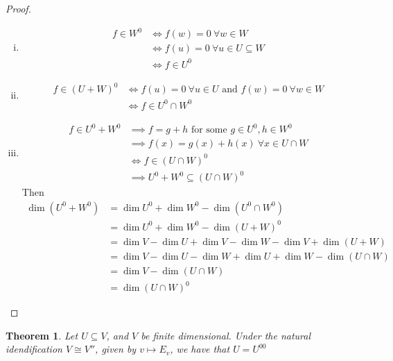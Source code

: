 \documentclass[10pt,fleqn]{article}
\theoremstyle{definition} \newtheorem{defn}{Definition}[section]
\theoremstyle{plain}      \newtheorem{thm}[defn]{Theorem}
\theoremstyle{plain}      \newtheorem{prop}[defn]{Proposition}
\theoremstyle{plain}      \newtheorem{lem}[defn]{Lemma}
\theoremstyle{plain}      \newtheorem{cor}[defn]{Corollary}
\theoremstyle{plain}      \newtheorem{ad}[defn]{Addendum}
\theoremstyle{definition} \newtheorem{ex}[defn]{Example}
\theoremstyle{definition} \newtheorem{rem}[defn]{Remark}
\numberwithin{equation}{subsection}
\begin{document}
\begin{proof}
    \begin{enumerate}[(i)]
        \item
        \begin{align*}
            f\in W^0
            &\iff
            f(w)=0~\forall w\in W\\
            &\iff
            f(u)=0~\forall u\in U\subseteq W\\
            &\iff
            f\in U^0
        \end{align*}
        \item
        \begin{align*}
            f\in(U+W)^0
            &\iff
            f(u)=0~\forall u\in U\text{ and }f(w)=0~\forall w\in W\\
            &\iff
            f\in U^0\cap W^0
        \end{align*}
        \item
        \begin{align*}
            f\in U^0+W^0
            &\implies
            f=g+h\text{ for some }g\in U^0,h\in W^0\\
            &\implies
            f(x)=g(x)+h(x)~\forall x\in U\cap W\\
            &\iff
            f\in(U\cap W)^0\\
            &\implies
            U^0+W^0\subseteq(U\cap W)^0
        \end{align*}
        Then
        \begin{align*}
            \dim(U^0+W^0)
            &=
            \dim U^0+\dim W^0-\dim(U^0\cap W^0)\\
            &=
            \dim U^0+\dim W^0-\dim(U+W)^0\\
            &=
            \dim V-\dim U+\dim V-\dim W-\dim V+\dim(U+W)\\
            &=
            \dim V-\dim U-\dim W+\dim U+\dim W-\dim(U\cap W)\\
            &=
            \dim V-\dim(U\cap W)\\
            &=
            \dim(U\cap W)^0
        \end{align*}
    \end{enumerate}
\end{proof}

\begin{thm}
    Let $U\subseteq V$, and $V$ be finite dimensional.
    Under the natural idendification $V\cong V''$, given by $v\mapsto E_v$, we have that $U=U^{00}$
\end{thm}
\end{document}
